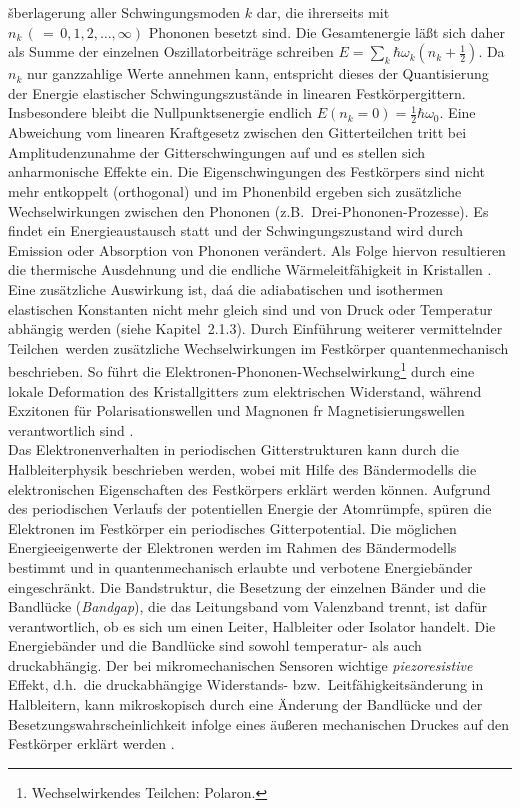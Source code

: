 šberlagerung aller Schwingungsmoden $k$ dar, die ihrerseits mit
$n_{k} \, (\, = \, 0,1,2, \ldots , \infty )$ Phononen besetzt
sind. Die Gesamtenergie läßt sich daher als Summe der einzelnen
Oszillatorbeiträge schreiben
$E = \sum_{k} \hbar \omega_{k} \left( n_{k} + \frac{1}{2} \right)$.
Da $n_{k}$  nur ganzzahlige Werte annehmen kann, entspricht dieses der
Quantisierung der Energie elastischer Schwingungszustände in linearen
Festkörpergittern.  Insbesondere bleibt die Nullpunktsenergie
endlich $E(n_{k} = 0) = \frac{1}{2} \hbar \omega_{0}$.
Eine Abweichung vom linearen Kraftgesetz zwischen den Gitterteilchen
tritt bei Amplitudenzunahme der Gitterschwingungen auf
und es stellen sich anharmonische Effekte ein.  Die Eigenschwingungen
des Festkörpers sind nicht mehr entkoppelt (orthogonal) und im
Phonenbild ergeben sich zusätzliche Wechselwirkungen zwischen den
Phononen (z.B.\  Drei-Phononen-Prozesse).  Es findet ein Energieaustausch
statt und der Schwingungszustand wird durch Emission oder Absorption von
Phononen verändert. Als Folge hiervon resultieren die thermische
Ausdehnung und die endliche Wärmeleitfähigkeit in Kristallen \cite{Kit88}.
Eine zusätzliche Auswirkung ist, daá die adiabatischen und isothermen
elastischen Konstanten nicht mehr gleich sind und von Druck oder
Temperatur abhängig werden (siehe Kapitel~2.1.3).  Durch Einführung
weiterer \glqq vermittelnder Teilchen\grqq \, werden zusätzliche Wechselwirkungen
im Festkörper quantenmechanisch beschrieben.
So führt die Elektronen-Phononen-Wechselwirkung\footnote{Wechselwirkendes
Teilchen: Polaron.} durch eine lokale Deformation des Kristallgitters
zum elektrischen Widerstand, während Exzitonen für Polarisationswellen
und Magnonen fr Magnetisierungswellen verantwortlich
sind \cite{Pau75}. \\
Das Elektronenverhalten in periodischen Gitterstrukturen kann durch die
Halbleiterphysik beschrieben werden, wobei mit Hilfe des Bändermodells
die elektronischen Eigenschaften des Festkörpers erklärt werden können.
Aufgrund des periodischen Verlaufs der potentiellen Energie der Atomrümpfe,
spüren die Elektronen im Festkörper ein periodisches Gitterpotential.
Die möglichen Energieeigenwerte der Elektronen werden im Rahmen des
Bändermodells bestimmt und in quantenmechanisch erlaubte und verbotene
Energiebänder eingeschränkt. Die Bandstruktur, die Besetzung der einzelnen
Bänder und die Bandlücke ({\sl Bandgap}), die das
Leitungsband vom Valenzband trennt, ist dafür verantwortlich, ob es sich
um einen Leiter, Halbleiter oder Isolator handelt.  Die Energiebänder
und die Bandlücke sind sowohl temperatur- als auch druckabhängig.  Der
bei mikromechanischen Sensoren wichtige {\em piezoresistive} Effekt,
d.h.\ die druckabhängige
Widerstands- bzw.\ Leitfähigkeitsänderung in Halbleitern,
kann mikroskopisch durch eine Änderung der Bandlücke und der
Besetzungswahrscheinlichkeit infolge eines
äußeren mechanischen Druckes auf den Festkörper erklärt werden \cite{Mid89}.


